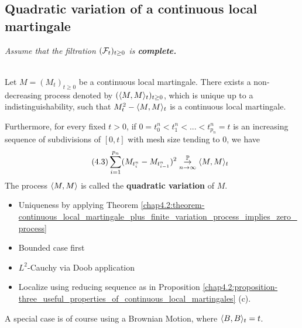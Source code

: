 \subsection{Quadratic variation of a continuous local martingale}\label{sec:qv}

\textit{Assume that the filtration $(\mathcal{F}_t)_{t\geq0}$ is \textbf{complete.}}

\begin{theorem}[Existence of $\br{M,M}$] \label{chap4.3:theorem-existence_of_quadratic_variation}
\\
Let $M=(M_t)_{t \geq 0}$ be a continuous local martingale. There exists a non-decreasing process denoted by $(\langle M,M\rangle_t)_{t\geq0}$, which is unique up to a indistinguishability, such that $M^2_t-\langle M,M\rangle_t$ is a continuous local martingale. 

Furthermore, for every fixed $t > 0$, if $0=t_0^n<t_1^n<...<t_{p_n}^n=t$ is an increasing sequence of subdivisions of $[0,t]$ with mesh size tending to 0, we have
\begin{equation}\tag{4.3}\label{chap4.3:eq-quadratic_variation_as_limit_of_subdivision_quadratic_variations}
\sum_{i=1}^{p_n} (M_{t_i^n}-M_{t_{i-1}^n})^2 \overset{\mathbb{P}}{\underset{n \to \infty}{\to}} \langle M,M\rangle_t
\end{equation}
The process $\br{M,M}$ is called the \textbf{quadratic variation} of $M$.
\end{theorem}
\begin{proofidea}
\begin{itemize}
    \item Uniqueness by applying Theorem \ref{chap4.2:theorem-continuous_local_martingale_plus_finite_variation_process_implies_zero_process}
    \item Bounded case first
    \item $L^2$-Cauchy via Doob application
    \item Localize using reducing sequence as in Proposition \ref{chap4.2:proposition-three_useful_properties_of_continuous_local_martingales} (c).
\end{itemize}
\end{proofidea}
A special case is of course using a Brownian Motion, where $\langle B,B\rangle_t=t$.
